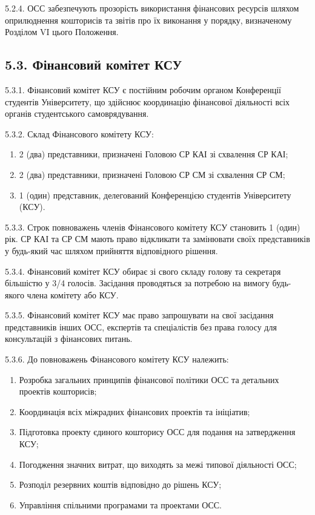     5.2.4. ОСС забезпечують прозорість використання фінансових ресурсів шляхом оприлюднення кошторисів та звітів про їх виконання у порядку, визначеному Розділом VI цього Положення.

\subsection*{5.3. Фінансовий комітет КСУ}
    5.3.1. Фінансовий комітет КСУ є постійним робочим органом Конференції студентів Університету, що здійснює координацію фінансової діяльності всіх органів студентського самоврядування.

    5.3.2. Склад Фінансового комітету КСУ:
        \begin{enumerate}[label=\alph*)]
            \item 2 (два) представники, призначені Головою СР КАІ зі схвалення СР КАІ;
            \item 2 (два) представники, призначені Головою СР СМ зі схвалення СР СМ;
            \item 1 (один) представник, делегований Конференцією студентів Університету (КСУ).
        \end{enumerate}

    5.3.3. Строк повноважень членів Фінансового комітету КСУ становить 1 (один) рік. СР КАІ та СР СМ мають право відкликати та замінювати своїх представників у будь-який час шляхом прийняття відповідного рішення.

    5.3.4. Фінансовий комітет КСУ обирає зі свого складу голову та секретаря більшістю у 3/4 голосів. Засідання проводяться за потребою на вимогу будь-якого члена комітету або КСУ.

    5.3.5. Фінансовий комітет КСУ має право запрошувати на свої засідання представників інших ОСС, експертів та спеціалістів без права голосу для консультацій з фінансових питань.

    5.3.6. До повноважень Фінансового комітету КСУ належить:
        \begin{enumerate}[label=\alph*)]
            \item Розробка загальних принципів фінансової політики ОСС та детальних проектів кошторисів;
            \item Координація всіх міжрадних фінансових проектів та ініціатив;
            \item Підготовка проекту єдиного кошторису ОСС для подання на затвердження КСУ;
            \item Погодження значних витрат, що виходять за межі типової діяльності ОСС;
            \item Розподіл резервних коштів відповідно до рішень КСУ;
            \item Управління спільними програмами та проектами ОСС.
        \end{enumerate}

